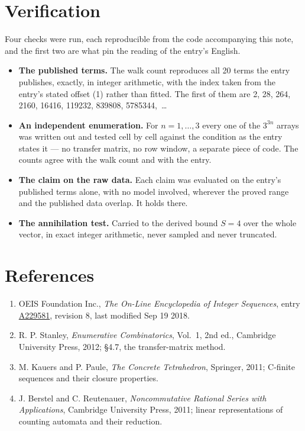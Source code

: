 \documentclass[11pt]{article}
\theoremstyle{definition}
\begin{document}
\section{Verification}

Four checks were run, each reproducible from the code accompanying this note, and the first two are what pin the reading of the entry's English.

\begin{itemize}

\item {\bfseries The published terms.} The walk count reproduces all 20 terms the entry publishes, exactly, in integer arithmetic, with the index taken from the entry's stated offset (1) rather than fitted. The first of them are 2, 28, 264, 2160, 16416, 119232, 839808, 5785344,~\dots

\item {\bfseries An independent enumeration.} For $n = 1,\dots,3$ every one of the $3^{3n}$ arrays was written out and tested cell by cell against the condition as the entry states it --- no transfer matrix, no row window, a separate piece of code. The counts agree with the walk count and with the entry.

\item {\bfseries The claim on the raw data.} Each claim was evaluated on the entry's published terms alone, with no model involved, wherever the proved range and the published data overlap. It holds there.

\item {\bfseries The annihilation test.} Carried to the derived bound $S = 4$ over the whole vector, in exact integer arithmetic, never sampled and never truncated.

\end{itemize}

\section{References}

\begin{enumerate}

\item OEIS Foundation Inc., \emph{The On-Line Encyclopedia of Integer Sequences}, entry \href{https://oeis.org/A229581}{A229581}, revision 8, last modified Sep 19 2018.

\item R. P. Stanley, \emph{Enumerative Combinatorics}, Vol.~1, 2nd ed., Cambridge University Press, 2012; \S4.7, the transfer-matrix method.

\item M. Kauers and P. Paule, \emph{The Concrete Tetrahedron}, Springer, 2011; C-finite sequences and their closure properties.

\item J. Berstel and C. Reutenauer, \emph{Noncommutative Rational Series with Applications}, Cambridge University Press, 2011; linear representations of counting automata and their reduction.

\end{enumerate}
\end{document}
